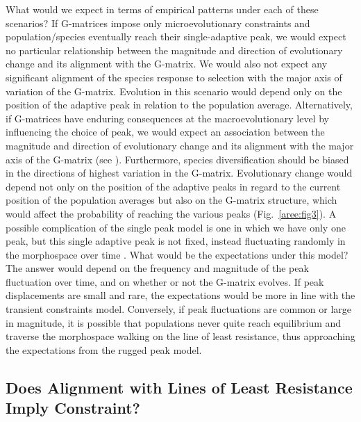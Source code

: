 \begin{refsection}
What would we expect in terms of empirical patterns under each of these
scenarios? If G-matrices impose only microevolutionary constraints and
population/species eventually reach their single-adaptive peak, we would
expect no particular relationship between the magnitude and direction of
evolutionary change and its alignment with the G-matrix. We would also
not expect any significant alignment of the species response to
selection with the major axis of variation of the G-matrix. Evolution in
this scenario would depend only on the position of the adaptive peak in
relation to the population average. Alternatively, if G-matrices have
enduring consequences at the macroevolutionary level by influencing the
choice of peak, we would expect an association between the magnitude and
direction of evolutionary change and its alignment with the major axis
of the G-matrix (see \textcite{Porto2015-zv}). Furthermore, species diversification should be biased in the
directions of highest variation in the G-matrix. Evolutionary change
would depend not only on the position of the adaptive peaks in regard to
the current position of the population averages but also on the G-matrix
structure, which would affect the probability of reaching the various
peaks (Fig.~\ref{aree:fig3}). A possible
complication of the single peak model is one in which we have only one
peak, but this single adaptive peak is not fixed, instead fluctuating
randomly in the morphospace over time \parencite{Jones2012-aq}. What would be
the expectations under this model? The answer would depend on the
frequency and magnitude of the peak fluctuation over time, and on
whether or not the G-matrix evolves. If peak displacements are small and
rare, the expectations would be more in line with the transient
constraints model. Conversely, if peak fluctuations are common or large
in magnitude, it is possible that populations never quite reach
equilibrium and traverse the morphospace walking on the line of least
resistance, thus approaching the expectations from the rugged peak
model.

\subsection{Does Alignment with Lines of Least Resistance Imply Constraint?}


\end{refsection}
